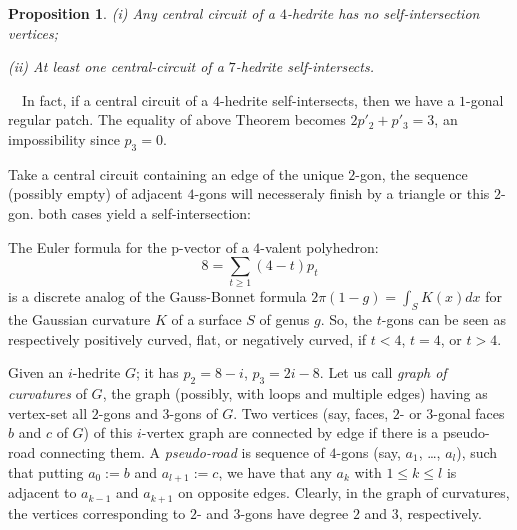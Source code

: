 \documentclass[12pt]{article}
\newtheorem{proposition}{Proposition}
\newcommand{\proof}{\noindent{\bf Proof.}\ \ }
\begin{document}
\begin{proposition}
(i) Any central circuit of a $4$-hedrite has no self-intersection vertices;

(ii) At least one central-circuit of a $7$-hedrite self-intersects.
\end{proposition}
\proof In fact, if a central circuit of a $4$-hedrite self-intersects, then we have a $1$-gonal regular patch. The equality of above Theorem becomes $2p'_2+p'_3=3$, an impossibility since $p_3=0$.

Take a central circuit containing an edge of the unique $2$-gon, the sequence (possibly empty) of adjacent $4$-gons will necesseraly finish by a triangle or this $2$-gon. both cases yield a self-intersection:

\begin{center}
\epsfxsize=60mm
\end{center}





The Euler formula for the p-vector of a $4$-valent polyhedron:
$$8=\sum_{t\geq 1} (4-t)p_t$$
is a discrete analog of the Gauss-Bonnet formula $2\pi(1-g)=\int_{S} K(x)dx$ for the Gaussian curvature $K$ of a surface $S$ of genus $g$. So, the $t$-gons can be seen as respectively positively curved, flat, or negatively curved, if $t<4$, $t=4$, or $t>4$.


Given an $i$-hedrite $G$; it has $p_2=8-i$, $p_3=2i-8$. Let us 
call {\em graph of curvatures} of $G$, the graph (possibly, with loops 
and multiple edges) having as vertex-set all $2$-gons and $3$-gons of $G$. 
Two vertices (say, faces, $2$- or $3$-gonal faces $b$ and $c$ of $G$) of 
this $i$-vertex graph are connected by edge if there is a pseudo-road 
connecting them. A {\em pseudo-road} is sequence of $4$-gons 
(say, $a_1$, \dots, $a_l$), such that putting $a_0:=b$ and $a_{l+1}:=c$, 
we have that any $a_k$ with $1\leq k\leq l$ is adjacent to $a_{k-1}$ 
and $a_{k+1}$ on opposite edges. Clearly, in the graph of curvatures, 
the vertices corresponding to $2$- and $3$-gons have degree $2$ and $3$, 
respectively.
\end{document}
